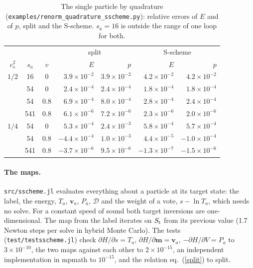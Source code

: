 \documentclass[11pt,aps,preprint,nofootinbib,superscriptaddress,tightenlines]{revtex4-2}
\def\Eq#1{eq.~(\ref{#1})}
\let\oldparagraph\paragraph
\renewcommand{\paragraph}{\par\bigskip\oldparagraph}
\begin{document}
\begin{table}[h]
\caption{The single particle by quadrature (\nolinkurl{examples/renorm_quadrature_sscheme.py}): relative errors of $E$ and of $p$, split and the
S-scheme.  $s_a=16$ is outside the range of one loop for both.}
\label{tab:single}
\small
\begin{tabular}{cccrrrr}
\toprule
 & & & \multicolumn{2}{c}{split} & \multicolumn{2}{c}{S-scheme} \\
$c_s^2$ & $s_a$ & $v$ & $E$ & $p$ & $E$ & $p$ \\
\midrule
$1/2$ & 16 & 0 & $3.9\times10^{-2}$ & $3.9\times10^{-2}$ & $4.2\times10^{-2}$ & $4.2\times10^{-2}$ \\
 & 54 & 0 & $2.4\times10^{-4}$ & $2.4\times10^{-4}$ & $1.8\times10^{-4}$ & $1.8\times10^{-4}$ \\
 & 54 & 0.8 & $6.9\times10^{-4}$ & $8.0\times10^{-4}$ & $2.8\times10^{-4}$ & $2.4\times10^{-4}$ \\
 & 541 & 0.8 & $6.1\times10^{-6}$ & $7.2\times10^{-6}$ & $2.3\times10^{-6}$ & $2.0\times10^{-6}$ \\
$1/4$ & 54 & 0 & $5.3\times10^{-4}$ & $2.4\times10^{-3}$ & $5.8\times10^{-4}$ & $5.7\times10^{-4}$ \\
 & 54 & 0.8 & $-4.4\times10^{-4}$ & $1.0\times10^{-3}$ & $4.4\times10^{-5}$ & $-1.0\times10^{-4}$ \\
 & 541 & 0.8 & $-3.7\times10^{-6}$ & $9.5\times10^{-6}$ & $-1.3\times10^{-7}$ & $-1.5\times10^{-6}$ \\
\bottomrule
\end{tabular}
\end{table}

\paragraph{The maps.}  \nolinkurl{src/sscheme.jl} evaluates everything about a particle at its target state: the label, the energy, $T_a$, $\bm v_a$, $P_a$,
$\mathcal D$ and the weight of a vote, $s-\ln T_a$, which needs no solve.  For a constant speed of sound both target inversions are one-dimensional.
The map from the label iterates on $S_{\rm t}$ from its previous value (1.7 Newton steps per solve in hybrid Monte Carlo).  The tests
(\nolinkurl{test/testsscheme.jl}) check $\partial H/\partial s=T_a$, $\partial H/\partial\bm m=\bm v_a$, $-\partial H/\partial V=P_a$ to $3\times10^{-10}$, the
two maps against each other to $2\times10^{-15}$, an independent implementation in mpmath to $10^{-15}$, and the relation \Eq{split} to split.
\end{document}
